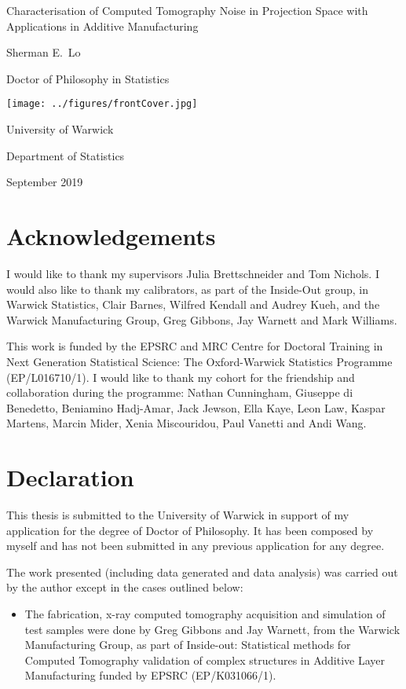 \documentclass[12pt, a4paper]{memoir}
\begin{document}
\sloppy

\begin{titlingpage}
\centering
{\LARGE Characterisation of Computed Tomography Noise in Projection Space with Applications in Additive Manufacturing \par}
\vspace{1cm}
{\Large Sherman E.~Lo\par}
{\Large Doctor of Philosophy in Statistics\par}
\vfill
\texttt{[image: ../figures/frontCover.jpg]}
\vfill
{\Large University of Warwick\par}
{\Large Department of Statistics\par}
{\Large September 2019\par}
\end{titlingpage}


\frontmatter

\newpage
\tableofcontents*
\newpage
\listoffigures
\newpage
\listoftables

\chapter{Acknowledgements}
I would like to thank my supervisors Julia Brettschneider and Tom Nichols. I would also like to thank my calibrators, as part of the Inside-Out group, in Warwick Statistics, Clair Barnes, Wilfred Kendall and Audrey Kueh, and the Warwick Manufacturing Group, Greg Gibbons, Jay Warnett and Mark Williams.

This work is funded by the EPSRC and MRC Centre for Doctoral Training in Next Generation Statistical Science: The Oxford-Warwick Statistics Programme (EP/L016710/1). I would like to thank my cohort for the friendship and collaboration during the programme: Nathan Cunningham, Giuseppe di Benedetto, Beniamino Hadj-Amar, Jack Jewson, Ella Kaye, Leon Law, Kaspar Martens, Marcin Mider, Xenia Miscouridou, Paul Vanetti and Andi Wang.

\chapter{Declaration}
This thesis is submitted to the University of Warwick in support of my application for the degree of Doctor of Philosophy. It has been composed by myself and has not been submitted in any previous application for any degree.

The work presented (including data generated and data analysis) was carried out by the author except in the cases outlined below:
\begin{itemize}
  \item The fabrication, x-ray computed tomography acquisition and simulation of test samples were done by Greg Gibbons and Jay Warnett, from the Warwick Manufacturing Group, as part of Inside-out: Statistical methods for Computed Tomography validation of complex structures in Additive Layer Manufacturing funded by EPSRC (EP/K031066/1).
\end{itemize}
\end{document}
